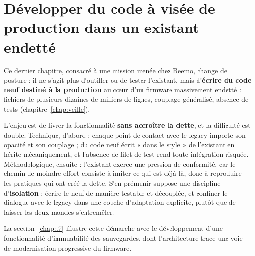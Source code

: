 \chapter{Développer du code à visée de production dans un existant endetté}
\label{chap:production}

Ce dernier chapitre, consacré à une mission menée chez Beemo, change de
posture : il ne s'agit plus
d'outiller ou de tester l'existant, mais d'\textbf{écrire du code neuf
destiné à la production} au cœur d'un firmware massivement endetté : fichiers
de plusieurs dizaines de milliers de lignes, couplage généralisé, absence de
tests (chapitre~\ref{chap:veille}).

L'enjeu est de livrer la fonctionnalité \textbf{sans accroître la dette}, et
la difficulté est double. Technique, d'abord : chaque point de contact avec
le legacy importe son opacité et son couplage ; du code neuf écrit « dans le
style » de l'existant en hérite mécaniquement, et l'absence de filet de test
rend toute intégration risquée. Méthodologique, ensuite : l'existant exerce
une pression de conformité, car le chemin de moindre effort consiste à imiter
ce qui est déjà là, donc à reproduire les pratiques qui ont créé la dette.
S'en prémunir suppose une discipline d'\textbf{isolation} : écrire le neuf
de manière testable et découplée, et confiner le dialogue avec le legacy dans
une couche d'adaptation explicite, plutôt que de laisser les deux mondes
s'entremêler.

La section~\ref{chap:t7} illustre cette démarche avec le développement d'une
fonctionnalité d'immuabilité des sauvegardes, dont l'architecture trace une
voie de modernisation progressive du firmware.
